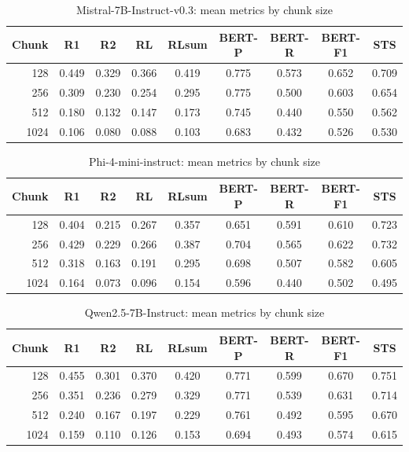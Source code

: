 \documentclass[11pt]{article}
\begin{document}
\begin{table}[H]
\centering
\caption{Mistral-7B-Instruct-v0.3: mean metrics by chunk size}
\label{tab:means-mistral}
\small
\begin{tabular}{rcccccccc}
\toprule
Chunk & R1 & R2 & RL & RLsum & BERT-P & BERT-R & BERT-F1 & STS \\
\midrule
128 & 0.449 & 0.329 & 0.366 & 0.419 & 0.775 & 0.573 & 0.652 & 0.709 \\
256 & 0.309 & 0.230 & 0.254 & 0.295 & 0.775 & 0.500 & 0.603 & 0.654 \\
512 & 0.180 & 0.132 & 0.147 & 0.173 & 0.745 & 0.440 & 0.550 & 0.562 \\
1024 & 0.106 & 0.080 & 0.088 & 0.103 & 0.683 & 0.432 & 0.526 & 0.530 \\
\bottomrule
\end{tabular}
\end{table}

\begin{table}[H]
\centering
\caption{Phi-4-mini-instruct: mean metrics by chunk size}
\label{tab:means-phi}
\small
\begin{tabular}{rcccccccc}
\toprule
Chunk & R1 & R2 & RL & RLsum & BERT-P & BERT-R & BERT-F1 & STS \\
\midrule
128 & 0.404 & 0.215 & 0.267 & 0.357 & 0.651 & 0.591 & 0.610 & 0.723 \\
256 & 0.429 & 0.229 & 0.266 & 0.387 & 0.704 & 0.565 & 0.622 & 0.732 \\
512 & 0.318 & 0.163 & 0.191 & 0.295 & 0.698 & 0.507 & 0.582 & 0.605 \\
1024 & 0.164 & 0.073 & 0.096 & 0.154 & 0.596 & 0.440 & 0.502 & 0.495 \\
\bottomrule
\end{tabular}
\end{table}

\begin{table}[H]
\centering
\caption{Qwen2.5-7B-Instruct: mean metrics by chunk size}
\label{tab:means-qwen}
\small
\begin{tabular}{rcccccccc}
\toprule
Chunk & R1 & R2 & RL & RLsum & BERT-P & BERT-R & BERT-F1 & STS \\
\midrule
128 & 0.455 & 0.301 & 0.370 & 0.420 & 0.771 & 0.599 & 0.670 & 0.751 \\
256 & 0.351 & 0.236 & 0.279 & 0.329 & 0.771 & 0.539 & 0.631 & 0.714 \\
512 & 0.240 & 0.167 & 0.197 & 0.229 & 0.761 & 0.492 & 0.595 & 0.670 \\
1024 & 0.159 & 0.110 & 0.126 & 0.153 & 0.694 & 0.493 & 0.574 & 0.615 \\
\bottomrule
\end{tabular}
\end{table}
\end{document}
